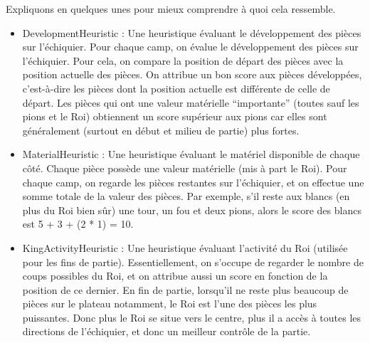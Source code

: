 \documentclass{article}
\begin{document}
Expliquons en quelques unes pour mieux comprendre à quoi cela ressemble.
\begin{itemize}
    \item DevelopmentHeuristic : Une heuristique évaluant le développement des pièces sur l'échiquier. Pour chaque camp, on évalue
    le développement des pièces sur l'échiquier. Pour cela, on compare la position de départ des pièces avec la position actuelle
    des pièces. On attribue un bon score aux pièces développées, c'est-à-dire les pièces dont la position actuelle est différente
    de celle de départ. Les pièces qui ont une valeur matérielle ``importante'' (toutes sauf les pions et le Roi) obtiennent un score
    supérieur aux pions car elles sont généralement (surtout en début et milieu de partie) plus fortes.
    \item MaterialHeuristic : Une heuristique évaluant le matériel disponible de chaque côté. Chaque pièce possède une valeur matérielle 
    (mis à part le Roi). Pour chaque camp, on regarde les pièces restantes sur l'échiquier, et on effectue une somme totale de la valeur
    des pièces. Par exemple, s'il reste aux blancs (en plus du Roi bien sûr) une tour, un fou et deux pions, alors le score des blancs
    est 5 + 3 + (2 * 1) = 10.
    \item KingActivityHeuristic : Une heuristique évaluant l'activité du Roi (utilisée pour les fins de partie). Essentiellement, on
    s'occupe de regarder le nombre de coups possibles du Roi, et on attribue aussi un score en fonction de la position de ce dernier.
    En fin de partie, lorsqu'il ne reste plus beaucoup de pièces sur le plateau notamment, le Roi est l'une des pièces les plus
    puissantes. Donc plus le Roi se situe vers le centre, plus il a accès à toutes les directions de l'échiquier, et donc un meilleur
    contrôle de la partie.
\end{itemize}
\end{document}
